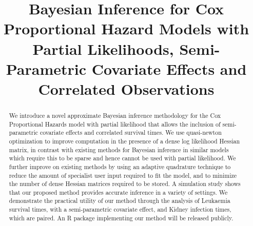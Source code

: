 \documentclass[ba]{imsart}
\begin{document}

\begin{frontmatter}
\title{Bayesian Inference for Cox Proportional Hazard Models with Partial Likelihoods, Semi-Parametric Covariate Effects and Correlated Observations}

\runtitle{}


\begin{abstract}
We introduce a novel approximate Bayesian inference methodology for the Cox Proportional Hazards model with partial likelihood that allows the inclusion of semi-parametric covariate effects and correlated survival times. We use quasi-newton optimization to improve computation in the presence of a dense log likelihood Hessian matrix, in contrast with existing methods for Bayesian inference in similar models which require this to be sparse and hence cannot be used with partial likelihood. We further improve on existing methods by using an adaptive quadrature technique to reduce the amount of specialist user input required to fit the model, and to minimize the number of dense Hessian matrices required to be stored. A simulation study shows that our proposed method provides accurate inference in a variety of settings. We demonstrate the practical utility of our method through the analysis of Leukaemia survival times, with a semi-parametric covariate effect, and Kidney infection times, which are paired. An R package implementing our method will be released publicly.
\end{abstract}

\begin{keyword}
\end{keyword}

\end{frontmatter}
\end{document}

